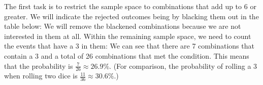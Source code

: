\documentclass{ximera}
\begin{document}
The first task is to restrict the sample space to combinations that add up to 6 or greater. We will indicate the rejected outcomes being by blacking them out in the table below:
We will remove the blackened combinations because we are not interested in them at all. Within the remaining sample space, we need to count the events that have a 3 in them:
We can see that there are 7 combinations that contain a 3 and a total of 26 combinations that met the condition. This means that the probability is $\frac{7}{26} \approx 26.9\%$. (For comparison, the probability of rolling a 3 when rolling two dice is $\frac{11}{36} \approx 30.6\%$.)
\end{document}
